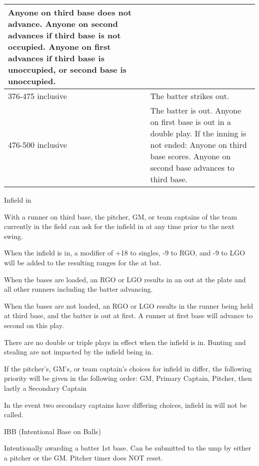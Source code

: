 \begin{deepEnumerate}
\begin{deepEnumerate}
\begin{center}
\begin{tabular}{|p{3cm}|p{8cm}|}
				Anyone on third base does not advance.
				Anyone on second advances if third base is not occupied.
				Anyone on first advances if third base is unoccupied, or second base is unoccupied. \\
				\hline 
				376-475 inclusive              & The batter strikes out.                          \\
				\hline
				476-500 inclusive              & The batter is out.                               
				Anyone on first base is out in a double play.
				If the inning is not ended:
				Anyone on third base scores.
				Anyone on second base advances to third base. \\
				\hline
			\end{tabular}
		\end{center}
    \end{deepEnumerate}
    \item Infield in
    \begin{deepEnumerate}
        \item With a runner on third base, the pitcher, GM, or team captains of the team currently in the field 
        can ask for the infield in at any time prior to the next swing.
        \item When the infield is in, a modifier of +18 to singles, -9 to RGO, and -9 to LGO 
        will be added to the resulting ranges for the at bat.
        \item When the bases are loaded, an RGO or LGO results in an out at the plate and all other runners including the batter advancing.
        \item When the bases are not loaded, an RGO or LGO results in the runner being held at third base, and the batter is out at first. 
        A runner at first base will advance to second on this play.
        \item There are no double or triple plays in effect when the infield is in. 
        Bunting and stealing are not impacted by the infield being in.
        \item If the pitcher’s, GM’s, or team captain’s choices for infield in differ, 
        the following priority will be given in the following order: 
        GM, Primary Captain, Pitcher, then lastly a Secondary Captain
        \begin{deepEnumerate}
            \item In the event two secondary captains have differing choices, infield in will not be called.
        \end{deepEnumerate}
    \end{deepEnumerate}
    \item IBB (Intentional Base on Balls)
    \begin{deepEnumerate}
        \item Intentionally awarding a batter 1st base. 
        Can be submitted to the ump by either a pitcher or the GM. 
        Pitcher timer does NOT reset.
    \end{deepEnumerate}
\end{deepEnumerate}
